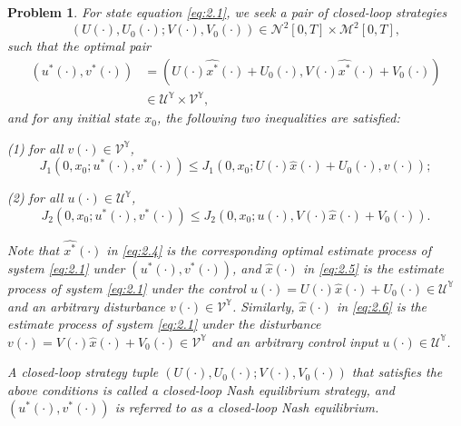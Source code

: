 \documentclass[lettersize,journal]{IEEEtran}
\theoremstyle{plain}
\newtheorem{pro}[thm]{Problem}
\theoremstyle{definition}
\begin{document}
\begin{pro}\label{pro:2.3}
	For state equation \eqref{eq:2.1}, we seek a pair of closed-loop strategies
	\begin{equation*}
		(U(\cdot),U_0(\cdot);V(\cdot),V_0(\cdot)) \in \mathcal{N}^2[0,T] \times \mathcal{M}^2[0,T],
	\end{equation*}
	such that the optimal pair
	\begin{equation}\label{eq:2.4}
		\begin{aligned}
			(u^*(\cdot),v^*(\cdot))
			&= (U(\cdot)\widehat{x^*}(\cdot) + U_0(\cdot),V(\cdot)\widehat{x^*}(\cdot) + V_0(\cdot)) \\
			&\in \mathcal{U}^{\mathbb{Y}} \times \mathcal{V}^{\mathbb{Y}},
		\end{aligned}
	\end{equation}
	and for any initial state $x_0$, the following two inequalities are satisfied:
	
	\medskip
	\noindent
	(1) for all $v(\cdot) \in \mathcal{V}^{\mathbb{Y}}$,
	\begin{equation}\label{eq:2.5}
		J_1(0,x_0;u^*(\cdot),v^*(\cdot)) \leq J_1(0,x_0;U(\cdot)\widehat{x}(\cdot) + U_0(\cdot),v(\cdot));
	\end{equation}
	
	\medskip
	\noindent
	(2) for all $u(\cdot) \in \mathcal{U}^{\mathbb{Y}}$,
	\begin{equation}\label{eq:2.6}
		J_2(0,x_0;u^*(\cdot),v^*(\cdot)) \leq J_2(0,x_0;u(\cdot),V(\cdot)\widehat{x}(\cdot) + V_0(\cdot)).
	\end{equation}
	
	Note that $\widehat{x^*}(\cdot)$ in \eqref{eq:2.4} is the corresponding optimal estimate process of system \eqref{eq:2.1} under $(u^*(\cdot),v^*(\cdot))$, and $\widehat{x}(\cdot)$ in \eqref{eq:2.5} is the estimate process of system \eqref{eq:2.1} under the control $u(\cdot) = U(\cdot)\widehat{x}(\cdot) + U_0(\cdot) \in \mathcal{U}^{\mathbb{Y}}$ and an arbitrary disturbance $v(\cdot) \in \mathcal{V}^{\mathbb{Y}}$. Similarly, $\widehat{x}(\cdot)$ in \eqref{eq:2.6} is the estimate process of system \eqref{eq:2.1} under the disturbance $v(\cdot) = V(\cdot)\widehat{x}(\cdot) + V_0(\cdot) \in \mathcal{V}^{\mathbb{Y}}$ and an arbitrary control input $u(\cdot) \in \mathcal{U}^{\mathbb{Y}}$.
	
	A closed-loop strategy tuple $(U(\cdot),U_0(\cdot);V(\cdot),V_0(\cdot))$ that satisfies the above conditions is called a closed-loop Nash equilibrium strategy, and $(u^*(\cdot),v^*(\cdot))$ is referred to as a closed-loop Nash equilibrium.
\end{pro}
\end{document}
